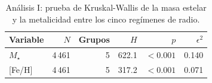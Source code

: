 \begin{table}[htbp]
    \centering
    \caption{Análisis I: prueba de Kruskal-Wallis de la masa estelar y la metalicidad entre los cinco regímenes de radio.}
    \label{tab:A1-T2}
    \small
    \begin{tabular}{lrrrrr}
    \toprule
    Variable & $N$ & Grupos & $H$ & $p$ & $\epsilon^2$ \\
    \midrule
    $M_\star$ & 4\,461 & 5 & 622.1 & $<0.001$ & 0.140 \\
    {[Fe/H]} & 4\,461 & 5 & 317.2 & $<0.001$ & 0.071 \\
    \bottomrule
    \end{tabular}
\end{table}
